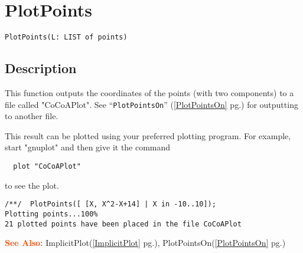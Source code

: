 \documentclass[a4paper]{mybook}
\newenvironment{command}{}{} %
\newcommand\SeeAlso{\par\textcolor{OrangeRed}{\textbf{\large See Also: }}}
\begin{document}
\section{PlotPoints}
\label{PlotPoints}
\begin{command} %


\begin{Verbatim}[label=syntax, rulecolor=\color{MidnightBlue},
frame=single]
PlotPoints(L: LIST of points)
\end{Verbatim}


\subsection*{Description}

This function outputs the coordinates of the points (with two
components) to a file called "CoCoAPlot".
See ``\verb&PlotPointsOn&'' (\ref{PlotPointsOn} pg.\pageref{PlotPointsOn}) for outputting to another file.
\par 
This result can be plotted using your preferred plotting program.
For example, start "gnuplot" and then give it the command
\begin{verbatim}  plot "CoCoAPlot"\end{verbatim}
to see the plot.
\begin{Verbatim}[label=example, rulecolor=\color{PineGreen}, frame=single]
/**/  PlotPoints([ [X, X^2-X+14] | X in -10..10]);
Plotting points...100%
21 plotted points have been placed in the file CoCoAPlot
\end{Verbatim}



\SeeAlso %
  ImplicitPlot(\ref{ImplicitPlot} pg.\pageref{ImplicitPlot}), 
    PlotPointsOn(\ref{PlotPointsOn} pg.\pageref{PlotPointsOn})
\end{command} %
\end{document}
